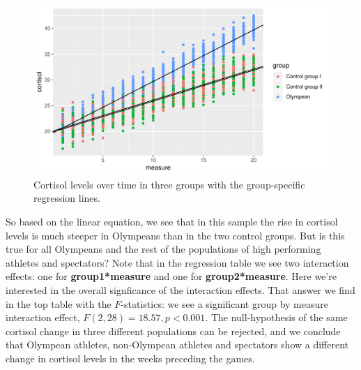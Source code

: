 \documentclass[]{report}\usepackage[]{graphicx}\usepackage[]{color}
\makeatletter
\def\maxwidth{ %
  \ifdim\Gin@nat@width>\linewidth
    \linewidth
  \else
    \Gin@nat@width
  \fi
}
\newenvironment{knitrout}{}{} %
\makeatother
\begin{document}
\begin{knitrout}
\color{fgcolor}\begin{figure}

{\centering \includegraphics[width=\maxwidth]{figure/analysismixed20_3-1} 

}

\caption[Cortisol levels over time in three groups with the group-specific regression lines]{Cortisol levels over time in three groups with the group-specific regression lines.}\label{fig:analysismixed20_3}
\end{figure}


\end{knitrout}

So based on the linear equation, we see that in this sample the rise in cortisol levels is much steeper in Olympeans than in the two control groups. But is this true for all Olympeans and the rest of the populations of high performing athletes and spectators? Note that in the regression table we see two interaction effects: one for \textbf{group1*measure} and one for \textbf{group2*measure}. Here we're interested in the overall signficance of the interaction effects. That answer we find in the top table with the $F$-statistics: we see a significant group by measure interaction effect, $F(2, 28)= 18.57, p<0.001$. The null-hypothesis of the same cortisol change in three different populations can be rejected, and we conclude that Olympean athletes, non-Olympean athletes and spectators show a different change in cortisol levels in the weeks preceding the games.  



\end{document}
